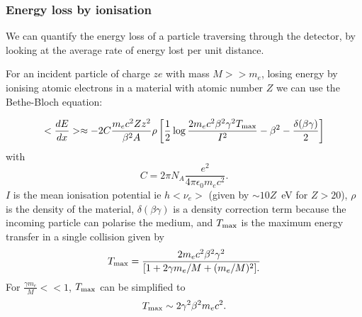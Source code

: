 \subsubsection{Energy loss by ionisation}
We can quantify the energy loss of a particle traversing through the detector, by looking at the average rate of energy lost per unit distance.


For an incident particle of charge $ze$ with mass $M>>m_e$, losing energy by ionising atomic electrons in a material with atomic number $Z$ we can use the Bethe-Bloch equation:

\begin{equation}
\label{eq:bethebloch}
<\frac{dE}{dx}>\approx -2C\frac{m_ec^2Zz^2}{\beta^2A}\rho\left[\frac{1}{2}\log\frac{2m_ec^2\beta^2\gamma^2T_{\rm max}}{I^2}-\beta^2-\frac{\delta(\beta\gamma)}{2}\right]
\end{equation}
with \[C=2\pi N_A\frac{e^2}{4\pi\epsilon_0m_ec^2}.\] 
$I$ is the mean ionisation potential ie $h<\nu_e>$ (given by $\sim10Z$~eV for $Z>20$), $\rho$ is the density of the material, $\delta(\beta\gamma)$ is a density correction term because the incoming particle can polarise the medium, and $T_{\rm max}$ is the maximum energy transfer in a single collision given by
\[
T_{\rm max}=\frac{2m_ec^2\beta^2\gamma^2}{[1+2\gamma m_e/M +(m_e/M)^2].}
\]
For $\frac{\gamma m_e}{M}<<1$, $T_{\rm max}$ can be simplified to
\[
T_{\rm max}\sim2\gamma^2\beta^2m_ec^2.
\]

